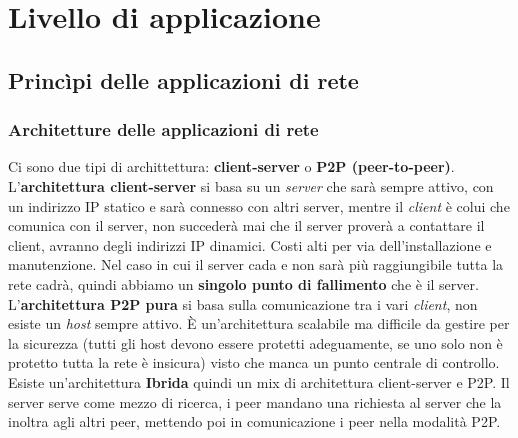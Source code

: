 \section{Livello di applicazione}

\subsection{Princìpi delle applicazioni di rete}

\subsubsection{Architetture delle applicazioni di rete}
Ci sono due tipi di archittettura: \textbf{client-server} o \textbf{P2P (peer-to-peer)}. \newline
L'\textbf{architettura client-server} si basa su un \textit{server} che sarà sempre attivo, con un indirizzo IP statico e sarà connesso con altri server, mentre il \textit{client} è colui che comunica con il server, non succederà mai che il server proverà a contattare il client, avranno degli indirizzi IP dinamici. Costi alti per via dell'installazione e manutenzione. Nel caso in cui il server cada e non sarà più raggiungibile tutta la rete cadrà, quindi abbiamo un \textbf{singolo punto di fallimento} che è il server.\newline
L'\textbf{architettura P2P pura} si basa sulla comunicazione tra i vari \textit{client}, non esiste un \textit{host} sempre attivo. È un'architettura scalabile ma difficile da gestire per la sicurezza (tutti gli host devono essere protetti adeguamente, se uno solo non è protetto tutta la rete è insicura) visto che manca un punto centrale di controllo. \newline
Esiste un'architettura \textbf{Ibrida} quindi un mix di architettura client-server e P2P.
Il server serve come mezzo di ricerca, i peer mandano una richiesta al server che la inoltra agli altri peer, mettendo poi in comunicazione i peer nella modalità P2P.

